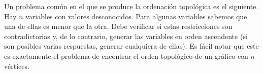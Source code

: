 Un problema común en el que se produce la ordenación topológica es el siguiente. Hay $n$ variables con valores desconocidos. Para algunas variables sabemos que una de ellas es menor que la otra. Debe verificar si estas restricciones son contradictorias y, de lo contrario, generar las variables en orden ascendente (si son posibles varias respuestas, generar cualquiera de ellas). Es fácil notar que este es exactamente el problema de encontrar el orden topológico de un gráfico con $n$ vértices.